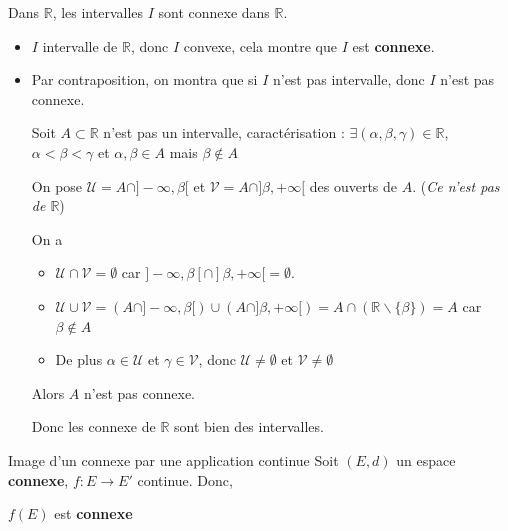 \begin{Example}{}{}
Dans $\mathbb{R}$, les intervalles $I$ sont connexe dans $\mathbb{R}$.
\end{Example}







\begin{myproof}
\begin{itemize}
    \item 
$I$ intervalle de $\mathbb{R}$, donc $I$ convexe, cela montre que $I$ est \textbf{connexe}.

\item Par contraposition, on montra que si  $I$ n'est pas intervalle, donc  $I$ n'est pas connexe.

Soit $A \subset \mathbb{R} $ n'est pas un intervalle, caractérisation :
$\exists (\alpha,\beta,\gamma) \in \mathbb{R}$, $\alpha < \beta < \gamma$ et $\alpha,\beta \in A$ mais $\beta \not\in A$

On pose $\mathcal{U}  = A \cap ]-\infty, \beta[$ et $\mathcal{V} =A \cap ]\beta, +\infty[$ des ouverts de $A$. (\textit{Ce n'est pas de $\mathbb{R}$})

On a 
\begin{itemize}
    \item $\mathcal{U} \cap \mathcal{V} = \emptyset$ car $]-\infty, \beta[ \cap ]\beta, +\infty[ = \emptyset$.
        \item $\mathcal{U} \cup \mathcal{V}  = (A \cap ]-\infty, \beta[) \cup (A \cap ]\beta, + \infty[) = A \cap (\mathbb{R} \backslash \{\beta\}) = A$ car $\beta \not \in A$
        \item De plus $\alpha \in \mathcal{U} $ et $\gamma \in \mathcal{V} $, donc $\mathcal{U} \ne \emptyset$ et $\mathcal{V} \ne \emptyset$
\end{itemize}
Alors $A$ n'est pas connexe.

Donc les connexe de $\mathbb{R}$ sont bien des intervalles.
\end{itemize}
\end{myproof}



\begin{Prop}{Image d'un connexe par une application continue}{}
Soit $(E,d)$ un espace \textbf{connexe}, $f: E \to E'$ continue. Donc,
\begin{center}
    $f(E)$ est \textbf{connexe}
\end{center}
\end{Prop}

